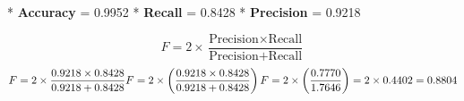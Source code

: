 *  \textbf{Accuracy} = 0.9952
*  \textbf{Recall} = 0.8428
*  \textbf{Precision} = 0.9218



\[ F = 2 \times \frac{\mbox{Precision} \times \mbox{Recall}}{\mbox{Precision} + \mbox{Recall}}\]\bigskip
\[ F = 2 \times \frac{\mbox{0.9218} \times \mbox{0.8428}}{\mbox{0.9218} + \mbox{0.8428}} \\  F = 2 \times \left( \frac{\mbox{0.9218} \times \mbox{0.8428}}{\mbox{0.9218} + \mbox{0.8428}} \right) \\ F = 2 \times \left( \frac{0.7770}{1.7646} \right) = 2 \times 0.4402 = 0.8804 \]



